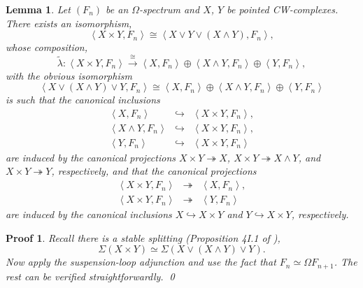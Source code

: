 \documentclass[sort&compress]{elsarticle}
\theoremstyle{theoremstyle}
\newtheorem{lem}[nul]{Lemma}
\theoremstyle{framedtheoremstyle}
\theoremstyle{definitionstyle}
\theoremstyle{definitionstyle}
\theoremstyle{definitionstyle}
\theoremstyle{definitionstyle}
\theoremstyle{nameddefinitionstyle}
\theoremstyle{framednameddefinitionstyle}
\theoremstyle{proofstyle}
\newtheorem{pf}{Proof}
\theoremstyle{definitionstyle}
\newcommand{\oneone}{\hookrightarrow}
\newcommand{\onto}{\twoheadrightarrow}
\newcommand{\xfromto}[1]{\xrightarrow{#1}}
\newcommand{\homotopic}{\simeq}
\newcommand{\isomorphic}{\cong}
\newcommand{\paren}[1]{\left( #1 \right)}
\newcommand{\angles}[1]{\left\langle #1 \right\rangle}
\begin{document}
\begin{appendices}
\begin{lem}\label{lem:stable_splitting}
Let $\paren{F_n}$ be an $\Omega$-spectrum and $X$, $Y$ be pointed CW-complexes.
There exists an isomorphism,
\begin{equation}
\angles{X \times Y, F_n} \isomorphic \angles{X\vee Y \vee (X\wedge Y), F_n},
\end{equation}
whose composition,
\begin{equation}
\tilde \lambda: \angles{X \times Y, F_n} \xfromto\isomorphic \angles{X, F_n} \oplus \angles{ X \wedge Y, F_n } \oplus \angles{Y, F_n},
\end{equation}
with the obvious isomorphism
\begin{equation}
\angles{ X \vee \paren{X \wedge Y} \vee Y , F_n } \isomorphic \angles{X, F_n} \oplus \angles{ X \wedge Y, F_n } \oplus \angles{Y, F_n}
\end{equation}
is such
that the canonical inclusions
\begin{eqnarray}
\angles{X, F_n} &\oneone& \angles{X\times Y, F_n}, \\
\angles{X \wedge Y, F_n} &\oneone& \angles{X \times Y, F_n}, \\
\angles{Y, F_n} &\oneone& \angles{X\times Y, F_n}
\end{eqnarray}
are induced by the canonical projections $X\times Y \onto X$, $X\times Y \onto X\wedge Y$, and $X\times Y \onto Y$, respectively,
and that the canonical projections
\begin{eqnarray}
\angles{X \times Y, F_n} &\onto& \angles{X, F_n}, \\
\angles{X \times Y, F_n} &\onto& \angles{Y, F_n}
\end{eqnarray}
are induced by the canonical inclusions $X \oneone X\times Y$ and $Y \oneone X\times Y$, respectively.
\end{lem}

\begin{pf}
Recall there is a stable splitting (Proposition 4I.1 of \cite{Hatcher}),
\begin{equation}
\Sigma (X \times Y) \homotopic \Sigma \paren{X \vee (X \wedge Y) \vee Y}.
\end{equation}
Now apply the suspension-loop adjunction and use the fact that $F_n \homotopic \Omega F_{n+1}$. The rest can be verified straightforwardly.
\qed\end{pf}


\end{appendices}
\end{document}
